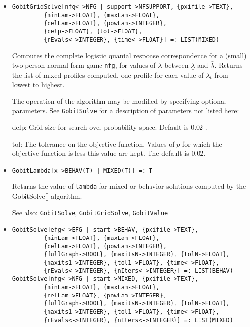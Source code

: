 \begin{itemize}

\item
\protect \large \begin{verbatim}
GobitGridSolve[nfg<->NFG | support->NFSUPPORT, {pxifile->TEXT},
         {minLam->FLOAT}, {maxLam->FLOAT}, 
         {delLam->FLOAT}, {powLam->INTEGER}, 
         {delp->FLOAT}, {tol->FLOAT},
         {nEvals<->INTEGER}, {time<->FLOAT}] =: LIST(MIXED)
\end{verbatim}\normalsize

\bd
Computes the complete logistic quantal response correspondence for
a (small) two-person normal form game \verb+nfg+, for values of
$\lambda$ between $\underline{\lambda}$ and $\bar{\lambda}.$ Returns
the list of mixed profiles computed, one profile for each value of
$\lambda_t$ from lowest to highest.

The operation of the algorithm may be modified by specifying optional
parameters.  See {\tt GobitSolve} for a description of parameters
not listed here:
\bd
\item
[delp:] Grid size for search over probability space.  Default is $0.02$ .
\item
[tol:] The tolerance on the objective function.  Values of $p$ for
which the objective function is less this value are kept.  The default
is $0.02$.  
\ed
\ed

\item
\protect \large \begin{verbatim}
GobitLambda[x->BEHAV(T) | MIXED(T)] =: T
\end{verbatim}\normalsize

\bd
Returns the value of \verb+lambda+ for mixed or behavior solutions
computed by the GobitSolve[] algorithm. 
\item
[See also:] {\tt GobitSolve}, {\tt GobitGridSolve}, {\tt GobitValue}
\ed

\item
\protect \large \begin{verbatim}
GobitSolve[efg<->EFG | start->BEHAV, {pxifile->TEXT},
         {minLam->FLOAT}, {maxLam->FLOAT},
         {delLam->FLOAT}, {powLam->INTEGER},
         {fullGraph->BOOL}, {maxitsN->INTEGER}, {tolN->FLOAT},
         {maxits1->INTEGER}, {tol1->FLOAT}, {time<->FLOAT},
         {nEvals<->INTEGER}, {nIters<->INTEGER}] =: LIST(BEHAV)
GobitSolve[nfg<->NFG | start->MIXED, {pxifile->TEXT},
         {minLam->FLOAT}, {maxLam->FLOAT},
         {delLam->FLOAT}, {powLam->INTEGER},
         {fullGraph->BOOL}, {maxitsN->INTEGER}, {tolN->FLOAT},
         {maxits1->INTEGER}, {tol1->FLOAT}, {time<->FLOAT},
         {nEvals<->INTEGER}, {nIters<->INTEGER}] =: LIST(MIXED)
\end{verbatim}\normalsize


\end{itemize}
